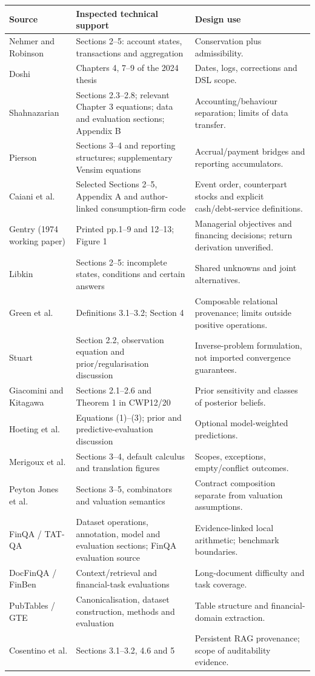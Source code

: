 \begin{longtable}{L{33mm}L{57mm}L{46mm}}
\toprule Source & Inspected technical support & Design use\\\midrule\endhead
Nehmer and Robinson & Sections 2--5: account states, transactions and aggregation &
Conservation plus admissibility.\\
Doshi & Chapters 4, 7--9 of the 2024 thesis & Dates, logs, corrections and DSL scope.\\
Shahnazarian & Sections 2.3--2.8; relevant Chapter 3 equations; data and evaluation
sections; Appendix B & Accounting/behaviour separation; limits of data transfer.\\
Pierson & Sections 3--4 and reporting structures; supplementary Vensim equations &
Accrual/payment bridges and reporting accumulators.\\
Caiani et al. & Selected Sections 2--5, Appendix A and author-linked
consumption-firm code & Event order, counterpart stocks and explicit
cash/debt-service definitions.\\
Gentry (1974 working paper) & Printed pp.1--9 and 12--13; Figure 1 &
Managerial objectives and financing decisions; return derivation unverified.\\
Libkin & Sections 2--5: incomplete states, conditions and certain answers &
Shared unknowns and joint alternatives.\\
Green et al. & Definitions 3.1--3.2; Section 4 & Composable relational provenance;
limits outside positive operations.\\
Stuart & Section 2.2, observation equation and prior/regularisation discussion &
Inverse-problem formulation, not imported convergence guarantees.\\
Giacomini and Kitagawa & Sections 2.1--2.6 and Theorem 1 in CWP12/20 &
Prior sensitivity and classes of posterior beliefs.\\
Hoeting et al. & Equations (1)--(3); prior and predictive-evaluation discussion &
Optional model-weighted predictions.\\
Merigoux et al. & Sections 3--4, default calculus and translation figures &
Scopes, exceptions, empty/conflict outcomes.\\
Peyton Jones et al. & Sections 3--5, combinators and valuation semantics &
Contract composition separate from valuation assumptions.\\
FinQA / TAT-QA & Dataset operations, annotation, model and evaluation sections;
FinQA evaluation source & Evidence-linked local arithmetic; benchmark boundaries.\\
DocFinQA / FinBen & Context/retrieval and financial-task evaluations &
Long-document difficulty and task coverage.\\
PubTables / GTE & Canonicalisation, dataset construction, methods and evaluation &
Table structure and financial-domain extraction.\\
Cosentino et al. & Sections 3.1--3.2, 4.6 and 5 & Persistent RAG provenance;
scope of auditability evidence.\\\bottomrule
\end{longtable}

